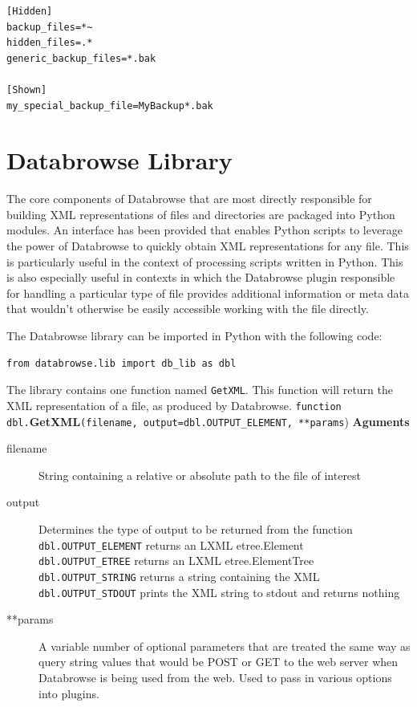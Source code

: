 \documentclass[10pt]{article}
\begin{document}
\begin{verbatim}
[Hidden]
backup_files=*~
hidden_files=.*
generic_backup_files=*.bak

[Shown]
my_special_backup_file=MyBackup*.bak
\end{verbatim}

\clearpage
\section{Databrowse Library}

The core components of Databrowse that are most directly responsible for building XML representations of files and directories are packaged into Python modules.  An interface has been provided that enables Python scripts to leverage the power of Databrowse to quickly obtain XML representations for any file.  This is particularly useful in the context of processing scripts written in Python.  This is also especially useful in contexts in which the Databrowse plugin responsible for handling a particular type of file provides additional information or meta data that wouldn't otherwise be easily accessible working with the file directly.

The Databrowse library can be imported in Python with the following code:

\begin{verbatim}
from databrowse.lib import db_lib as dbl
\end{verbatim}

The library contains one function named \texttt{GetXML}.  This function will return the XML representation of a file, as produced by Databrowse.
\hfill\break
\hfill\break
\noindent \texttt{function dbl.}\textbf{GetXML}\texttt{(filename, output=dbl.OUTPUT\_ELEMENT, **params})
\hfill\break
\hfill\break
\noindent \textbf{Aguments} 
\begin{changemargin}{0.25in}{0in}
\begin{description}
	\item[filename] String containing a relative or absolute path to the file of interest
	\item[output] Determines the type of output to be returned from the function \\
				  \texttt{dbl.OUTPUT\_ELEMENT} returns an LXML etree.Element \\
				  \texttt{dbl.OUTPUT\_ETREE} returns an LXML etree.ElementTree \\
				  \texttt{dbl.OUTPUT\_STRING} returns a string containing the XML \\
				  \texttt{dbl.OUTPUT\_STDOUT} prints the XML string to stdout and returns nothing
    \item[**params] A variable number of optional parameters that are treated the same way as query string values that would be POST or GET to the web server when Databrowse is being used from the web.  Used to pass in various options into plugins.
\end{description}
\end{changemargin}
\end{document}
